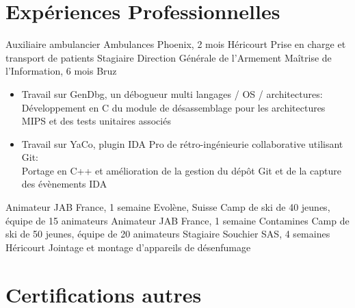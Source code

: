 \documentclass[10pt,sans]{moderncv}
\begin{document}

	\vspace*{\deletedSpace}
	\section{Expériences Professionnelles}
			{Auxiliaire ambulancier}
			{Ambulances Phoenix, 2 mois}
			{Héricourt}
			{Prise en charge et transport de patients}
			{}
			{Stagiaire}
			{Direction Générale de l'Armement Maîtrise de l'Information, 6 mois}
			{Bruz}
			{}
			{}
			\vspace{-5pt}
			\begin{itemize}
				\item Travail sur GenDbg, un débogueur multi langages / OS / architectures:\\
					\phantom{=}Développement en C du module de désassemblage pour les architectures MIPS et des tests unitaires associés
				\item Travail sur YaCo, plugin IDA Pro de rétro-ingénieurie collaborative utilisant Git:\\
					\phantom{=}Portage en C++ et amélioration de la gestion du dépôt Git et de la capture des évènements IDA
			\end{itemize}
			\vspace{5pt}
			{Animateur}
			{JAB France, 1 semaine}
			{Evolène, Suisse}
			{Camp de ski de 40 jeunes, équipe de 15 animateurs}
			{}
			{Animateur}
			{JAB France, 1 semaine}
			{Contamines}
			{Camp de ski de 50 jeunes, équipe de 20 animateurs}
			{}
			{Stagiaire}
			{Souchier SAS, 4 semaines}
			{Héricourt}
			{Jointage et montage d'appareils de désenfumage}
			{}

	\newpage


	\section{Certifications autres}
\end{document}
